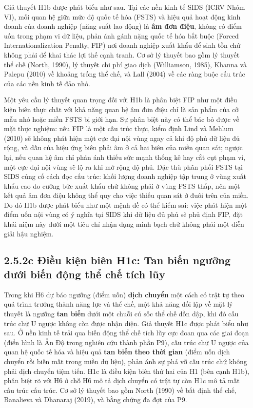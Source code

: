\documentclass[
  a4paper,
  13pt]{extreport}
\begin{document}
Giả thuyết H1b được phát biểu như sau. Tại các nền kinh tế SIDS (ICRV
Nhóm VI), mối quan hệ giữa mức độ quốc tế hóa (FSTS) và hiệu quả hoạt
động kinh doanh của doanh nghiệp (năng suất lao động) là \textbf{âm đơn
điệu}, không có điểm uốn trong phạm vi dữ liệu, phản ánh gánh nặng quốc
tế hóa bắt buộc (Forced Internationalization Penalty, FIP) nơi doanh
nghiệp xuất khẩu để sinh tồn chứ không phải để khai thác lợi thế cạnh
tranh. Cơ sở lý thuyết bao gồm lý thuyết thể chế (North, 1990), lý
thuyết chi phí giao dịch (Williamson, 1985), Khanna và Palepu (2010) về
khoảng trống thể chế, và Lall (2004) về các ràng buộc cấu trúc của các
nền kinh tế đảo nhỏ.

Một yêu cầu lý thuyết quan trọng đối với H1b là phân biệt FIP như một
điều kiện biên thực chất với khả năng quan hệ âm đơn điệu chỉ là sản
phẩm của cỡ mẫu nhỏ hoặc miền FSTS bị giới hạn. Sự phân biệt này có thể
bác bỏ được về mặt thực nghiệm: nếu FIP là một cấu trúc thực, kiểm định
Lind và Mehlum (2010) sẽ không phát hiện một cực đại nội vùng ngay cả
khi độ phủ dữ liệu đủ rộng, và dấu của hiệu ứng biên phải âm ở cả hai
biên của miền quan sát; ngược lại, nếu quan hệ âm chỉ phản ánh thiếu sức
mạnh thống kê hay cắt cụt phạm vi, một cực đại nội vùng sẽ lộ ra khi mở
rộng độ phủ. Đặc thù phân phối FSTS tại SIDS củng cố cách đọc cấu trúc:
khối lượng doanh nghiệp tập trung ở vùng xuất khẩu cao do cưỡng bức xuất
khẩu chứ không phải ở vùng FSTS thấp, nên một kết quả âm đơn điệu không
thể quy cho việc thiếu quan sát ở đuôi trên của miền. Do đó H1b được
phát biểu như một mệnh đề có thể kiểm sai: việc phát hiện một điểm uốn
nội vùng có ý nghĩa tại SIDS khi dữ liệu đủ phủ sẽ phủ định FIP, đặt
khái niệm này dưới một tiêu chí nhận dạng minh bạch chứ không phải một
diễn giải hậu nghiệm.

\hypertarget{c-ux111iux1ec1u-kiux1ec7n-biuxean-h1c-tan-biux1ebfn-ngux1b0ux1ee1ng-dux1b0ux1edbi-biux1ebfn-ux111ux1ed9ng-thux1ec3-chux1ebf-tuxedch-lux169y}{%
\subsection{2.5.2c Điều kiện biên H1c: Tan biến ngưỡng dưới biến động
thể chế tích
lũy}\label{c-ux111iux1ec1u-kiux1ec7n-biuxean-h1c-tan-biux1ebfn-ngux1b0ux1ee1ng-dux1b0ux1edbi-biux1ebfn-ux111ux1ed9ng-thux1ec3-chux1ebf-tuxedch-lux169y}}

Trong khi H6 dự báo ngưỡng (điểm uốn) \textbf{dịch chuyển} một cách có
trật tự theo quá trình trưởng thành năng lực và thể chế, một khả năng
đối lập về mặt lý thuyết là ngưỡng \textbf{tan biến} dưới một chuỗi cú
sốc thể chế dồn dập, khi đó cấu trúc chữ U ngược không còn được nhận
diện. Giả thuyết H1c được phát biểu như sau. Ở nền kinh tế trải qua biến
động thể chế tích lũy cực đoan qua các giai đoạn (điển hình là Ấn Độ
trong nghiên cứu thành phần P9), cấu trúc chữ U ngược của quan hệ quốc
tế hóa và hiệu quả \textbf{tan biến theo thời gian} (điểm uốn dịch
chuyển rồi biến mất trong miền dữ liệu), phản ánh sự phá vỡ cấu trúc chứ
không phải dịch chuyển tiệm tiến. H1c là điều kiện biên thứ hai của H1
(bên cạnh H1b), phân biệt rõ với H6 ở chỗ H6 mô tả dịch chuyển có trật
tự còn H1c mô tả mất cấu trúc cấu trúc. Cơ sở lý thuyết bao gồm North
(1990) về bất định thể chế, Banalieva và Dhanaraj (2019), và bằng chứng
đa đợt của P9.
\end{document}
